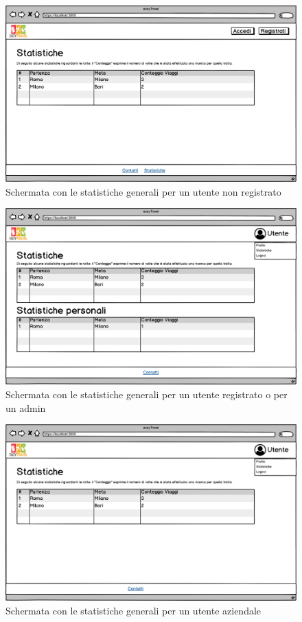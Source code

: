 \documentclass[11pt]{article}
\begin{document}
\begin{figure}[!ht]
	\includegraphics[width=1\textwidth]{./Mockup/Statistiche-non-registrato} %
	\caption{Schermata con le statistiche generali per un utente non registrato}
	\label{fig:statistichenonreg}
\end{figure}

\begin{figure}[!ht]
	\includegraphics[width=1\textwidth]{./Mockup/Statistiche-user-admin} %
	\caption{Schermata con le statistiche generali per un utente registrato o per un admin}
	\label{fig:statisticheuseradmin}
\end{figure}

\begin{figure}[!ht]
	\includegraphics[width=1\textwidth]{./Mockup/Statistiche-aziendale} %
	\caption{Schermata con le statistiche generali per un utente aziendale}
	\label{fig:statisticheaziendale}
\end{figure}
\end{document}
